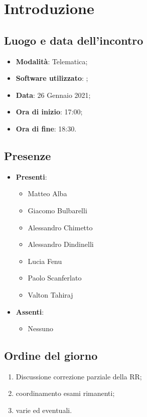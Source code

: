 \documentclass[]{article}
\begin{document}
	
	
	
	\newpage
	
	
		\section{Introduzione}
		\subsection{Luogo e data dell'incontro}
		\begin{itemize}
			\item \textbf{Modalità}: Telematica;
			\item \textbf{Software utilizzato}: ;
			\item \textbf{Data}: 26 Gennaio 2021;
			\item \textbf{Ora di inizio}: 17:00;
			\item \textbf{Ora di fine}: 18:30.
		\end{itemize}

		\subsection{Presenze}
		\begin{itemize}
			\item \textbf{Presenti}:
			\begin{itemize}
				\item Matteo Alba
				\item Giacomo Bulbarelli
				\item Alessandro Chimetto
				\item Alessandro Dindinelli
				\item Lucia Fenu
				\item Paolo Scanferlato
				\item Valton Tahiraj
			\end{itemize}
			\item \textbf{Assenti}:
			\begin{itemize}
				\item Nessuno
			\end{itemize}
		\end{itemize}


		\subsection{Ordine del giorno}
		\begin{enumerate}
			\item Discussione correzione parziale della RR;
			\item coordinamento esami rimanenti;
			\item varie ed eventuali.
		\end{enumerate}
\end{document}
